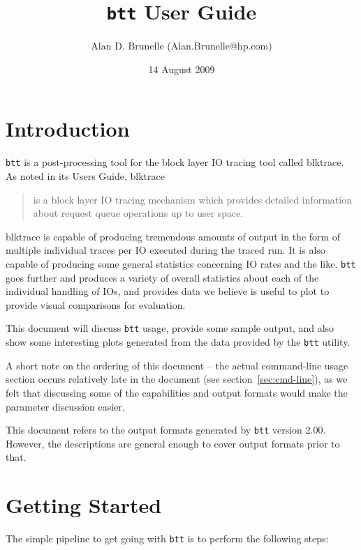 \documentclass{article}
\title{\texttt{btt} User Guide}
\author{Alan D. Brunelle (Alan.Brunelle@hp.com)}
\date{14 August 2009}
\begin{document}
\maketitle
\section{\label{sec:intro}Introduction}

\texttt{btt} is a post-processing tool for the block layer IO tracing
tool called blktrace. As noted in its Users Guide, blktrace

  \begin{quotation}
    is a block layer IO tracing mechanism which provides detailed
    information about request queue operations up to user space.
  \end{quotation}

blktrace is capable of producing tremendous amounts of output in the
form of multiple individual traces per IO executed during the traced
run. It is also capable of producing some general statistics concerning
IO rates and the like. \texttt{btt} goes further and produces a variety
of overall statistics about each of the individual handling of IOs, and
provides data we believe is useful to plot to provide visual comparisons
for evaluation.

This document will discuss \texttt{btt} usage, provide some sample output,
and also show some interesting plots generated from the data provided
by the \texttt{btt} utility.

\bigskip
A short note on the ordering of this document -- the actual
command-line usage section occurs relatively late in the document (see
section~\ref{sec:cmd-line}), as we felt that discussing some of the
capabilities and output formats would make the parameter discussion
easier.

\bigskip
  This document refers to the output formats generated by \texttt{btt}
  version 2.00.  However, the descriptions are general enough to cover
  output formats prior to that.

\newpage\tableofcontents

\newpage\section{\label{sec:getting-started}Getting Started}

  The simple pipeline to get going with \texttt{btt} is to perform the
  following steps:
\end{document}
